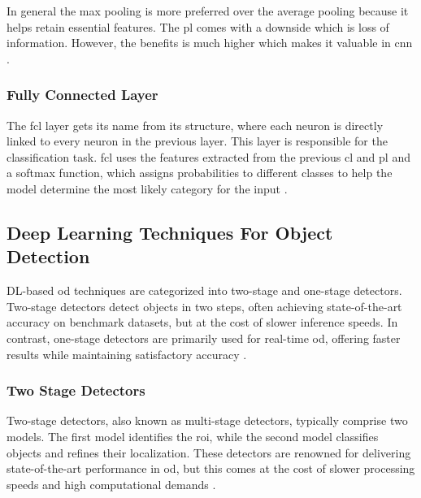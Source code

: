 In general the max pooling is more preferred over the average pooling because it helps retain essential features. The \gls{pl} comes with a downside which is loss of information. However, the benefits is much higher which makes it valuable in \gls{cnn} \cite{ibm_cnn}.

\subsubsection{Fully Connected Layer}
The \gls{fcl} layer gets its name from its structure, where each neuron is directly linked to every neuron in the previous layer. This layer is responsible for the classification task. \gls{fcl} uses the features extracted from the previous \gls{cl} and \gls{pl} and a softmax function, which assigns probabilities to different classes to help the model determine the most likely category for the input \cite{ibm_cnn}.



\subsection{Deep Learning Techniques For Object Detection}
DL-based \gls{od} techniques are categorized into two-stage and one-stage detectors. Two-stage detectors detect objects in two steps, often achieving state-of-the-art accuracy on benchmark datasets, but at the cost of slower inference speeds. In contrast, one-stage detectors are primarily used for real-time \gls{od}, offering faster results while maintaining satisfactory accuracy \cite{oD_Review}.

\subsubsection{Two Stage Detectors}
Two-stage detectors, also known as multi-stage detectors, typically comprise two models. The first model identifies the \gls{roi}, while the second model classifies objects and refines their localization. These detectors are renowned for delivering state-of-the-art performance in \gls{od}, but this comes at the cost of slower processing speeds and high computational demands \cite{oD_Review}.

